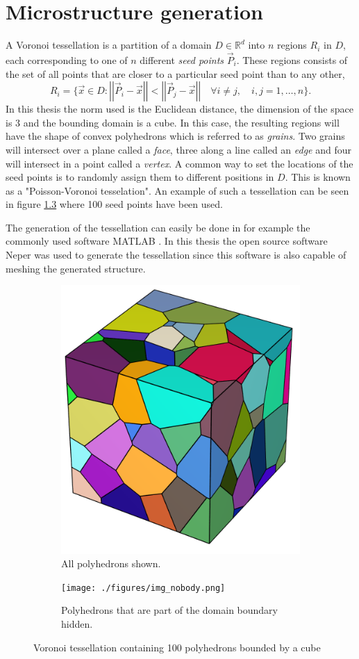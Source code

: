 \documentclass[micro_gen.tex]{subfiles}
\begin{document}
\chapter{Microstructure generation}


A Voronoi tessellation is a partition of a domain $D \in \mathbb{R}^d$ into $n$ regions $R_i$ in $D$, each corresponding to one of $n$ different \textit{seed points} $\vec{P}_i$. These regions consists of the set of all points that are closer to a particular seed point than to any other,
%
\[R_i = \{ \vec{x} \in D : \left|\left| \vec{P}_i - \vec{x} \right|\right| < \left|\left| \vec{P}_j - \vec{x} \right|\right| \quad  \forall i \neq j, \quad i,j = 1, \ldots, n \}. \]
%
In this thesis the norm used is the Euclidean distance, the dimension of the space is 3 and the bounding domain is a cube. In this case, the resulting regions will have the shape of convex polyhedrons which is referred to as \textit{grains}. Two grains will intersect over a plane called a \textit{face}, three along a line called an \textit{edge} and four will intersect in a point called a \textit{vertex}.
A common way to set the locations of the seed points is to randomly assign them to different positions in $D$. This is known as a "Poisson-Voronoi tesselation". An example of such a tessellation can be seen in figure \ref{fig:pois_voronoi} where 100 seed points have been used.

The generation of the tessellation can easily be done in for example the commonly used software MATLAB \cite{matlab:voronoi}. In this thesis the open source software Neper \cite{Quey20111729} was used to generate the tessellation since this software is also capable of meshing the generated structure. 




\begin{figure}
\centering
\begin{subfigure}[b]{.5\textwidth}
  \centering
  \includegraphics[width=.5\linewidth]{./figures/img_body.png}
  \caption{All polyhedrons shown.}
  \label{fig:pois_voronoi_a}
\end{subfigure}%
\begin{subfigure}[b]{.5\textwidth}
  \centering
  \texttt{[image: ./figures/img\_nobody.png]}
  \caption{Polyhedrons that are part of the domain boundary hidden.}
  \label{fig:pois_voronoi_b}
\end{subfigure}
\caption{Voronoi tessellation containing 100 polyhedrons bounded by a cube}
\label{fig:pois_voronoi}
\end{figure}
\end{document}
